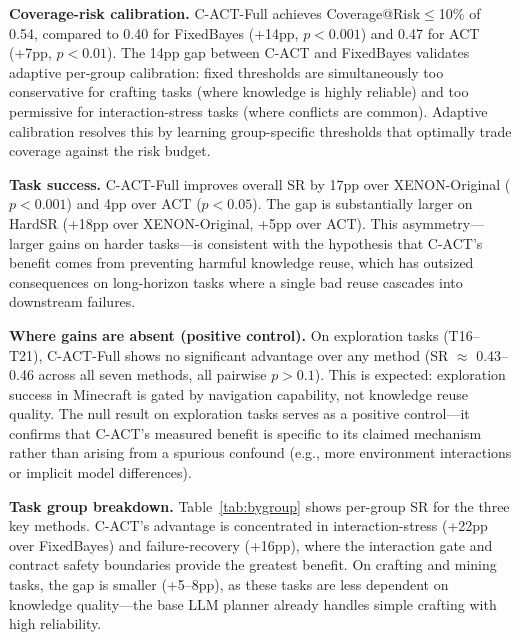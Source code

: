 \documentclass[letterpaper]{article}
\begin{document}
\textbf{Coverage-risk calibration.} \textsc{C-ACT}-Full achieves Coverage@Risk$\le$10\% of 0.54, compared to 0.40 for FixedBayes (+14pp, $p < 0.001$) and 0.47 for ACT (+7pp, $p < 0.01$). The 14pp gap between \textsc{C-ACT} and FixedBayes validates adaptive per-group calibration: fixed thresholds are simultaneously too conservative for crafting tasks (where knowledge is highly reliable) and too permissive for interaction-stress tasks (where conflicts are common). Adaptive calibration resolves this by learning group-specific thresholds that optimally trade coverage against the risk budget.

\textbf{Task success.} \textsc{C-ACT}-Full improves overall SR by 17pp over \textsc{XENON}-Original ($p < 0.001$) and 4pp over ACT ($p < 0.05$). The gap is substantially larger on HardSR (+18pp over \textsc{XENON}-Original, +5pp over ACT). This asymmetry---larger gains on harder tasks---is consistent with the hypothesis that \textsc{C-ACT}'s benefit comes from preventing harmful knowledge reuse, which has outsized consequences on long-horizon tasks where a single bad reuse cascades into downstream failures.

\textbf{Where gains are absent (positive control).} On exploration tasks (T16--T21), \textsc{C-ACT}-Full shows no significant advantage over any method (SR $\approx$ 0.43--0.46 across all seven methods, all pairwise $p > 0.1$). This is expected: exploration success in Minecraft is gated by navigation capability, not knowledge reuse quality. The null result on exploration tasks serves as a positive control---it confirms that \textsc{C-ACT}'s measured benefit is specific to its claimed mechanism rather than arising from a spurious confound (e.g., more environment interactions or implicit model differences).

\textbf{Task group breakdown.} Table~\ref{tab:bygroup} shows per-group SR for the three key methods. \textsc{C-ACT}'s advantage is concentrated in interaction-stress (+22pp over FixedBayes) and failure-recovery (+16pp), where the interaction gate and contract safety boundaries provide the greatest benefit. On crafting and mining tasks, the gap is smaller (+5--8pp), as these tasks are less dependent on knowledge quality---the base LLM planner already handles simple crafting with high reliability.
\end{document}
